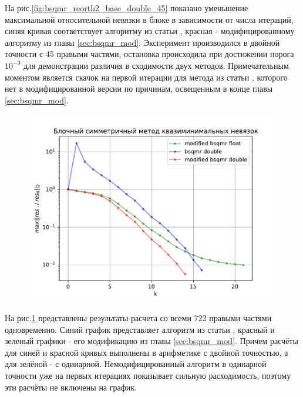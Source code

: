 \par На рис.\ref{fig:bsqmr_reorth2_base_double_45} показано уменьшение максимальной
относительной невязки в блоке в зависимости от числа итераций, синяя кривая соответствует 
алгоритму из статьи \cite{doi:10.1137/0917019}, красная - модифицированному алгоритму из
главы \ref{sec:bsqmr_mod}. Эксперимент производился в двойной точности с 45 правыми частями, 
остановка происходила при достижении порога $10^{-3}$ для демонстрации различия в сходимости двух методов.
Примечательным моментом является скачок на первой итерации для метода из статьи \cite{doi:10.1137/0917019}, которого
нет в модифицированной версии по причинам, освещенным в конце главы \ref{sec:bsqmr_mod}.

\begin{figure}[H]
    \centering
    \includegraphics[width=0.7\linewidth]{images/bsqmr_722_base_reorth2_doublevsfloat.pdf}
    \caption{}
    \label{fig:bsqmr_722_base_reorth2_doublevsfloat}
\end{figure}

\par На рис.\ref{fig:bsqmr_722_base_reorth2_doublevsfloat} представлены результаты 
расчета со всеми 722 правыми частями одновременно. Синий график представляет алгоритм
из статьи \cite{doi:10.1137/0917019}, красный и зеленый графики - его модификацию из главы \ref{sec:bsqmr_mod}.
Причем расчёты для синей и красной кривых выполнены в арифметике с двойной точностью, а для зелёной - с одинарной.
Немодифицированный алгоритм в одинарной точности уже на первых итерациях показывает сильную расходимость,
поэтому эти расчёты не включены на график. 

